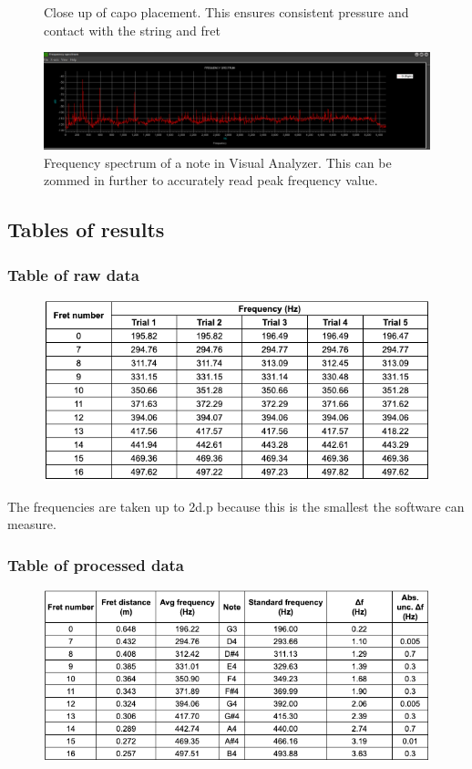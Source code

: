 \documentclass[11pt]{article}
\begin{document}
\begin{flushleft}
\begin{figure}
                \caption{Close up of capo placement. This ensures consistent pressure and contact with the string and fret} \label{fig6}
                \includegraphics[width = \textwidth]{freq.png}
                \caption{Frequency spectrum of a note in Visual Analyzer. This can be zommed in further to accurately read peak frequency value.} \label{fig7}
            \end{figure}
        \newpage
        \subsection{Tables of results}
            \subsubsection*{Table of raw data}
                \begin{figure}[!h]
                    \includegraphics[width = \textwidth]{raw_table.png}
                \end{figure}
            The frequencies are taken up to 2d.p because this is the smallest the software can measure.
            \subsubsection*{Table of processed data}
                \begin{figure}[!h]
                    \includegraphics[width = \textwidth]{processed_table.png}
                \end{figure}

\end{flushleft}
\end{document}
